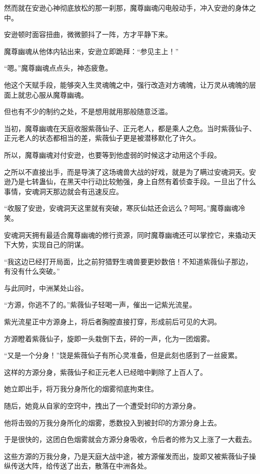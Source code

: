 \begin{this_body}
然而就在安逊心神彻底放松的那一刹那，魔尊幽魂闪电般动手，冲入安逊的身体之中。

安逊顿时面容扭曲，微微颤抖了一阵，方才平静下来。

魔尊幽魂从他体内钻出来，安逊立即跪拜：“参见主上！”

“嗯。”魔尊幽魂点点头，神态疲惫。

他这个天赋手段，能够突入生灵魂魄之中，强行改造对方魂魄，让万灵从魂魄的层面上就忠心服从魔尊幽魂。

但也有不少的制约之处，不是想用就用那般随意泛滥。

当初，魔尊幽魂在天庭收服紫薇仙子、正元老人，都是乘人之危。当时紫薇仙子、正元老人的状态都相当的差，紫薇仙子更是被潜移默化了许久。

所以，魔尊幽魂对付安逊，也要等到他虚弱的时候这才动用这个手段。

之所以不直接出手，而是导演了这场魂兽大战的好戏，就是为了瞒过安魂洞天。安逊乃是七转蛊仙，在黑天中行动比较勉强，身上自然有着侦查手段。一旦出了什么事情，安魂洞天那边就会有迅速反应。

“收服了安逊，安魂洞天这里就有突破，寒灰仙姑还会远么？呵呵。”魔尊幽魂冷笑。

安魂洞天拥有最适合魔尊幽魂的修行资源，同时魔尊幽魂还可以掌控它，来撬动天下大势，实现自己的阴谋。

“我这边已经打开局面，比之前狩猎野生魂兽要更妙数倍！不知道紫薇仙子那边，有没有什么突破。”

与此同时，中洲某处山谷。

“方源，你逃不了的。”紫薇仙子轻喝一声，催出一记紫光流星。

紫光流星正中方源身上，将后者胸膛直接打穿，形成前后可见的大洞。

方源瞪着紫薇仙子，旋即一头栽倒下去，砰的一声，化为一团烟雾。

“又是一个分身！”饶是紫薇仙子有所心灵准备，但是此刻也感到了一丝疲累。

这样的方源分身，紫薇仙子和正元老人已经暗中剿除了上百人了。

她立即出手，将万我分身所化的烟雾彻底拘束住。

随后，她竟从自家的空窍中，拽出了一个遭受封印的方源分身。

他将击毁的万我分身所化的烟雾，悉数投入到被封印的方源分身上去。

于是很快的，这团白色烟雾就会方源分身吸收，令后者的修为又上涨了一大截去。

这些方源的万我分身，乃是天庭大战中途，被方源催发而出，旋即又被紫薇仙子操纵传送大阵，给传送了出去，散落在中洲各处。


\end{this_body}
